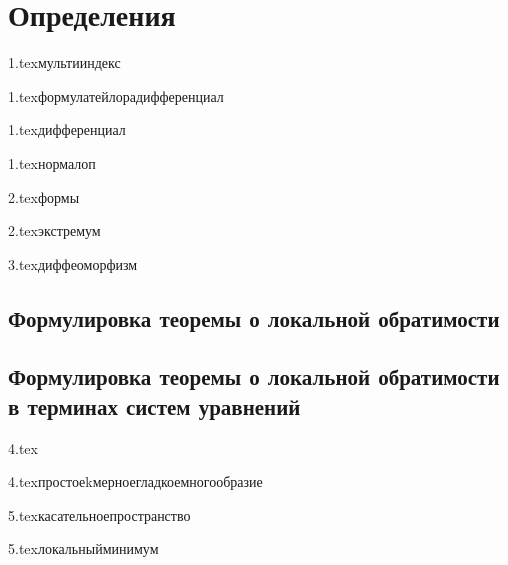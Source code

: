 

\usepackage{sectsty}

\allsectionsfont{\raggedright}
\subsectionfont{\fontsize{14}{15}\selectfont}

\cfoot{}
\rfoot{}




\section{Определения}

{1.tex}{мультииндекс}

{1.tex}{формулатейлорадифференциал}

{1.tex}{дифференциал}

{1.tex}{нормалоп}

{2.tex}{формы}

{2.tex}{экстремум}

{3.tex}{диффеоморфизм}

\subsection{Формулировка теоремы о локальной обратимости}

\subsection{Формулировка теоремы о локальной обратимости в терминах систем уравнений}

{4.tex}{}

{4.tex}{простоеkмерноегладкоемногообразие}

{5.tex}{касательноепространство}

{5.tex}{локальныйминимум}

